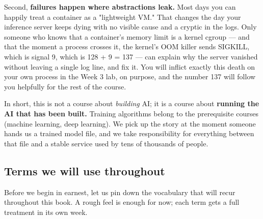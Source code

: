 Second, \textbf{failures happen where abstractions leak.} Most days you can happily treat a container as a "lightweight VM." That changes the day your inference server keeps dying with no visible cause and a cryptic  in the logs. Only someone who knows that a container's memory limit is a kernel cgroup — and that the moment a process crosses it, the kernel's OOM killer sends SIGKILL, which is signal 9, which is 128 + 9 = 137 — can explain why the server vanished without leaving a single log line, and fix it. You will inflict exactly this death on your own process in the Week 3 lab, on purpose, and the number 137 will follow you helpfully for the rest of the course.

In short, this is not a course about \textit{building} AI; it is a course about \textbf{running the AI that has been built.} Training algorithms belong to the prerequisite courses (machine learning, deep learning). We pick up the story at the moment someone hands us a trained model file, and we take responsibility for everything between that file and a stable service used by tens of thousands of people.

\subsection*{Terms we will use throughout}

Before we begin in earnest, let us pin down the vocabulary that will recur throughout this book. A rough feel is enough for now; each term gets a full treatment in its own week.

